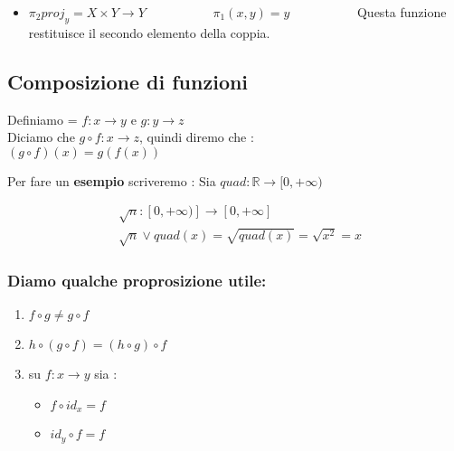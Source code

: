 \documentclass[article,12pt]{book}
\begin{document}
\begin{enumerate}
{\begin{itemize}
            \item $\pi_2 proj_y = X \times Y \rightarrow Y     $ \ \ \ \ \ \ \ \ \ \ $\pi_1 (x,y) = y$ \ \ \ \ \ \ \ \ \ \ Questa funzione restituisce il secondo elemento della coppia.


            
        \end{itemize}
\newpage
\subsection{Composizione di funzioni}
Definiamo = $f: x \rightarrow y$ e $g : y \rightarrow z$ \\
Diciamo che $g \circ f : x \rightarrow z$, quindi diremo che : \ \ \ \ \ \ \ \ \ \ \ \ \ \  \ \ \ $(g \circ f) (x) = g(f(x))$



\begin{center}
\end{center}
Per fare un \textbf{esempio} scriveremo : 
Sia $quad : \mathbb{R} \rightarrow [0, +\infty)$
\begin{center}
    \begin{align*}
        &\sqrt{n} : [0, +\infty)] \rightarrow [0, +\infty] \\
        &\sqrt{n} \lor quad(x) = \sqrt{quad(x)} = \sqrt{x^2} = x
    \end{align*}
\end{center}
\subsubsection{Diamo qualche proprosizione utile:}

\begin{enumerate}
    \item $f \circ g \neq g \circ f$
    \item $h \circ (g \circ f) = (h \circ g) \circ f$
    \item su $f : x \rightarrow y$ sia :
        \begin{itemize}
            \item $f \circ id_x = f$
            \item $id_y \circ f = f$
        \end{itemize}
    

\end{enumerate}}
\end{enumerate}
\end{document}
